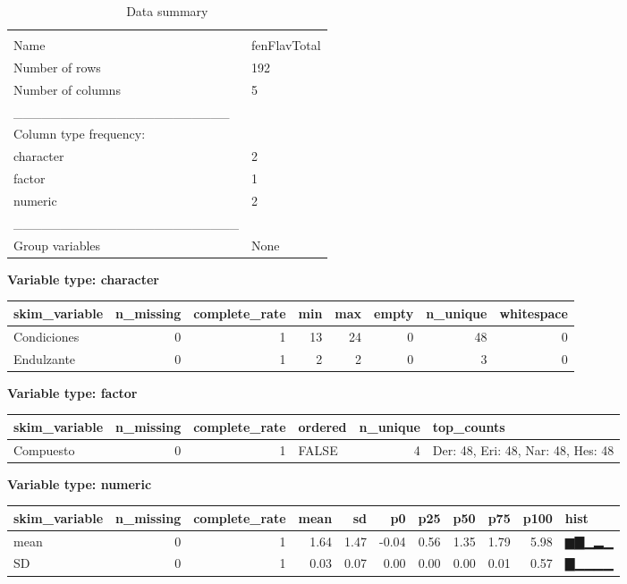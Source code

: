 \documentclass[
]{article}
\begin{document}
\begin{longtable}[]{@{}ll@{}}
\caption{Data summary}\tabularnewline
\toprule
& \\
\midrule
\endfirsthead
\toprule
& \\
\midrule
\endhead
Name & fenFlavTotal \\
Number of rows & 192 \\
Number of columns & 5 \\
\_\_\_\_\_\_\_\_\_\_\_\_\_\_\_\_\_\_\_\_\_\_\_ & \\
Column type frequency: & \\
character & 2 \\
factor & 1 \\
numeric & 2 \\
\_\_\_\_\_\_\_\_\_\_\_\_\_\_\_\_\_\_\_\_\_\_\_\_ & \\
Group variables & None \\
\bottomrule
\end{longtable}

\textbf{Variable type: character}

\begin{longtable}[]{@{}lrrrrrrr@{}}
\toprule
skim\_variable & n\_missing & complete\_rate & min & max & empty &
n\_unique & whitespace \\
\midrule
\endhead
Condiciones & 0 & 1 & 13 & 24 & 0 & 48 & 0 \\
Endulzante & 0 & 1 & 2 & 2 & 0 & 3 & 0 \\
\bottomrule
\end{longtable}

\textbf{Variable type: factor}

\begin{longtable}[]{@{}lrrlrl@{}}
\toprule
skim\_variable & n\_missing & complete\_rate & ordered & n\_unique &
top\_counts \\
\midrule
\endhead
Compuesto & 0 & 1 & FALSE & 4 & Der: 48, Eri: 48, Nar: 48, Hes: 48 \\
\bottomrule
\end{longtable}

\textbf{Variable type: numeric}

\begin{longtable}[]{@{}lrrrrrrrrrl@{}}
\toprule
skim\_variable & n\_missing & complete\_rate & mean & sd & p0 & p25 &
p50 & p75 & p100 & hist \\
\midrule
\endhead
mean & 0 & 1 & 1.64 & 1.47 & -0.04 & 0.56 & 1.35 & 1.79 & 5.98 &
▆▇▁▂▁ \\
SD & 0 & 1 & 0.03 & 0.07 & 0.00 & 0.00 & 0.00 & 0.01 & 0.57 & ▇▁▁▁▁ \\
\bottomrule
\end{longtable}
\end{document}

